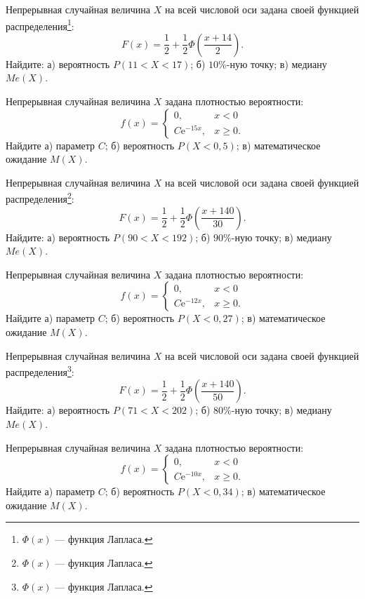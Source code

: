 \vfill

\newpage\setcounter{zad}{0}

\z Непрерывная случайная величина $X$ на всей числовой оси задана своей функцией распределения\footnote{$\Phi(x)$ --- функция Лапласа.}: $$ F(x) = \frac{1}{2} + \frac{1}{2}\Phi\left( \frac{x + 14}{2} \right). $$ Найдите: а) вероятность $P(11 < X < 17)$; б) $10\%$-ную точку; в) медиану $Me(X)$.


\vfill

\z Непрерывная случайная величина $X$ задана плотностью вероятности: $$ f(x) = \begin{cases}0, & x < 0 \\ C\mathrm{e}^{-15x}, & x \geqslant 0.\end{cases} $$ Найдите а) параметр $C$; б) вероятность $P(X < 0{,}5)$; в) математическое ожидание $M(X)$.
 

\vfill

\newpage\setcounter{zad}{0}

\z Непрерывная случайная величина $X$ на всей числовой оси задана своей функцией распределения\footnote{$\Phi(x)$ --- функция Лапласа.}: $$ F(x) = \frac{1}{2} + \frac{1}{2}\Phi\left( \frac{x + 140}{30} \right). $$ Найдите: а) вероятность $P(90 < X < 192)$; б) $90\%$-ную точку; в) медиану $Me(X)$.


\vfill

\z Непрерывная случайная величина $X$ задана плотностью вероятности: $$ f(x) = \begin{cases}0, & x < 0 \\ C\mathrm{e}^{-12x}, & x \geqslant 0.\end{cases} $$ Найдите а) параметр $C$; б) вероятность $P(X < 0{,}27)$; в) математическое ожидание $M(X)$.
 

\vfill

\newpage\setcounter{zad}{0}

\z Непрерывная случайная величина $X$ на всей числовой оси задана своей функцией распределения\footnote{$\Phi(x)$ --- функция Лапласа.}: $$ F(x) = \frac{1}{2} + \frac{1}{2}\Phi\left( \frac{x + 140}{50} \right). $$ Найдите: а) вероятность $P(71 < X < 202)$; б) $80\%$-ную точку; в) медиану $Me(X)$.


\vfill

\z Непрерывная случайная величина $X$ задана плотностью вероятности: $$ f(x) = \begin{cases}0, & x < 0 \\ C\mathrm{e}^{-10x}, & x \geqslant 0.\end{cases} $$ Найдите а) параметр $C$; б) вероятность $P(X < 0{,}34)$; в) математическое ожидание $M(X)$.
 

